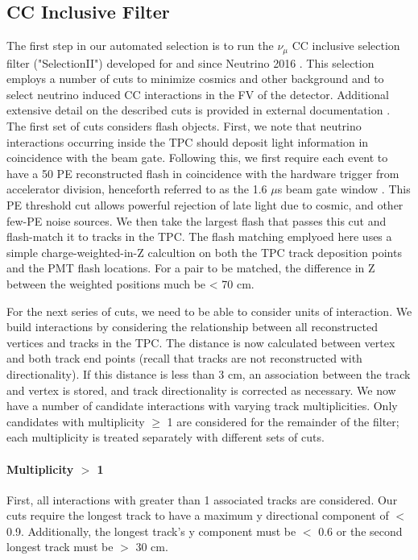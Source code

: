 \documentclass[12pt]{article}
\begin{document}
\subsection{CC Inclusive Filter} The first step in our automated selection is to run the $\nu_\mu$ CC inclusive selection filter ("SelectionII") developed for and since Neutrino 2016 \cite{bib:numucc}.  This selection employs a number of cuts to minimize cosmics and other background and to select neutrino induced CC interactions in the FV of the detector. Additional extensive detail on the described cuts is provided in external documentation \cite{bib:numucc}.  
\noindent The first set of cuts considers flash objects.  First, we note that neutrino interactions occurring inside the TPC should deposit light information in coincidence with the beam gate. Following this, we first require each event to have a 50 PE reconstructed flash in coincidence with the hardware trigger from accelerator division, henceforth referred to as the 1.6 $\mu$s beam gate window \cite{bib:first_nus}. This PE threshold cut allows powerful rejection of late light due to cosmic, and other few-PE noise sources. We then take the largest flash that passes this cut and flash-match it to tracks in the TPC.  The flash matching emplyoed here uses a simple charge-weighted-in-Z calcultion on both the TPC track deposition points and the PMT flash locations. For a pair to be matched, the difference in Z between the weighted positions much be < 70 cm. 
\par For the next series of cuts, we need to be able to consider units of interaction. We build interactions by considering the relationship between all reconstructed vertices and tracks in the TPC. The distance is now calculated between vertex and both track end points (recall that tracks are not reconstructed with directionality). If this distance is less than 3 cm, an association between the track and vertex is stored, and track directionality is corrected as necessary. We now have a number of candidate interactions with varying track multiplicities.  Only candidates with multiplicity $\geq$ 1 are considered for the remainder of the filter; each multiplicity is treated separately with different sets of cuts.
\paragraph{Multiplicity $>$ 1}
\par First, all interactions with greater than 1 associated tracks are considered. Our cuts require the longest track to have a maximum y directional component of $<$ 0.9.  Additionally, the longest track's y component must be $<$ 0.6 or the second longest track must be $>$ 30 cm.
\end{document}
